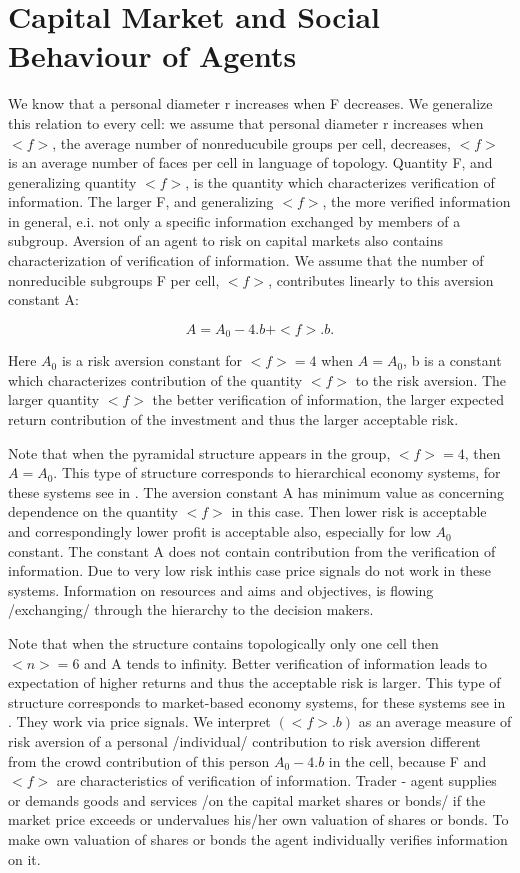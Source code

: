 \documentclass[10pt]{article}
\begin{document}
   
   
\section{Capital Market and Social Behaviour of Agents}

We know \cite{5}  that a personal diameter r increases when F decreases. We generalize this relation to every cell: we assume that personal diameter r increases when $<f>$, the average number of nonreducubile groups per cell, decreases, $<f>$ is an average number of faces per cell in language of topology. Quantity F, and generalizing quantity $<f>$, is the quantity which characterizes verification of information. The larger F, and generalizing $ <f> $, the more verified information in general, e.i. not only a specific information exchanged by members of a subgroup. Aversion of an agent to risk on capital
markets also contains characterization of verification of information. We assume that the number of nonreducible subgroups F per cell, $<f>$, contributes linearly to this aversion constant A:

\begin{equation}
\label{1}
A = A_{0} - 4.b + <f>.b .
\end{equation}

Here $ A_{0}$ is a risk aversion constant for $<f> = 4$ when $A = A_{0} $, b is a constant which characterizes contribution
of the quantity $<f>$ to the risk aversion. The larger quantity $<f>$ the better verification of information, the larger expected return contribution of the investment and thus the larger acceptable risk.


Note that when the pyramidal structure appears in the group, $<f> = 4$, then $A = A_{0} $.
This type of structure  corresponds to hierarchical economy systems, for these systems see in \cite{6}. The aversion constant A has minimum value as concerning dependence on the quantity $ <f> $ in this case. Then lower risk is acceptable and correspondingly lower profit is acceptable also, especially for low $ A_{0} $ constant. The constant A does not contain contribution from the verification of information. Due to very low risk inthis case price signals do not work in these systems. Information on resources and aims and objectives, is flowing /exchanging/ through the hierarchy to the decision makers.


Note that when the structure
contains topologically only one cell then $<n> = 6$ and A tends to infinity. Better verification of information leads to expectation of higher returns and thus the acceptable risk is larger.
This type of structure  corresponds to market-based economy systems, for these systems see in \cite{6}. They work via price signals.
We interpret $(<f>.b)$ as an average measure of risk aversion of a personal /individual/ contribution to risk aversion different from the crowd contribution of this person $ A_{0} - 4.b $ in the cell, because F and $<f>$ are characteristics of verification of information. Trader - agent supplies or demands goods and services /on the capital market shares or bonds/ if the market price exceeds or undervalues his/her own valuation of shares or bonds. To make own valuation of shares or bonds the agent individually verifies information on it.
\end{document}
